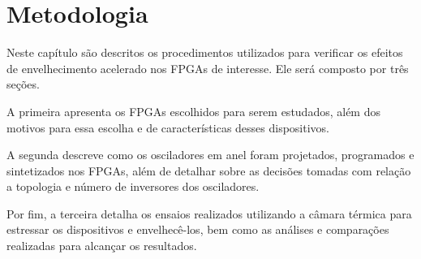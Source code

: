 \chapter{Metodologia}
\label{sec:Metodologia}
Neste capítulo são descritos os procedimentos utilizados para verificar os efeitos de envelhecimento acelerado nos FPGAs de interesse. Ele será composto por três seções.

A primeira apresenta os FPGAs escolhidos para serem estudados, além dos motivos para essa escolha e de características desses dispositivos.

A segunda descreve como os osciladores em anel foram projetados, programados e sintetizados nos FPGAs, além de detalhar sobre as decisões tomadas com relação a topologia e número de inversores dos osciladores.

Por fim, a terceira detalha os ensaios realizados utilizando a câmara térmica para estressar os dispositivos e envelhecê-los, bem como as análises e comparações realizadas para alcançar os resultados.




